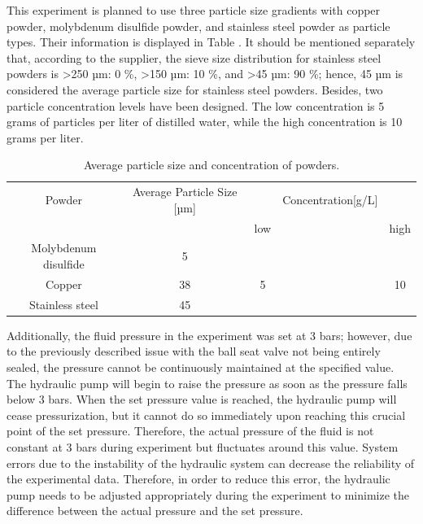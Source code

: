 This experiment is planned to use three particle size gradients with copper 
  powder, molybdenum disulfide powder, and stainless steel powder as particle 
  types. Their information is displayed in Table . It should be mentioned 
  separately that, according to the supplier, the sieve size distribution for 
  stainless steel powders is \textgreater 250 µm: 0 \%, \textgreater 150 µm: 10 \%, and \textgreater 45 µm: 90 \%; hence,
   45 µm is considered the average particle size for stainless steel powders.
 Besides, two particle concentration levels have been designed. The low 
 concentration is 5 grams of particles per liter of distilled water, 
 while the high concentration is 10 grams per liter.


\begin{table}[h!]
    \centering
    \begin{tabular}{|c| c |c c c|} 
     \hline
     Powder & Average Particle Size [µm] &     & Concentration[g/L] &  \\ [0.5ex] 
     
            &                            & low &                    & high \\
     \hline    
     Molybdenum disulfide & 5  & & &\\
     Copper &                         38 &  5  &                    & 10\\
     Stainless steel      & 45 & & &\\[1ex]
     \hline
    \end{tabular}
    \caption{Average particle size and concentration of powders.}
    \label{tab:Powder Information}
    \end{table}

   
Additionally, the fluid pressure in the experiment was set at 3 bars; however, 
 due to the previously described issue with the ball seat valve not being entirely 
 sealed, the pressure cannot be continuously maintained at the specified value. 
 The hydraulic pump will begin to raise the pressure as soon as the pressure 
 falls below 3 bars. When the set pressure value is reached, the hydraulic 
 pump will cease pressurization, but it cannot do so immediately upon reaching 
 this crucial point of the set pressure. Therefore, the actual pressure of the 
 fluid is not constant at 3 bars during experiment but fluctuates around this 
 value. System errors due to the instability of the hydraulic system can decrease
 the reliability of the experimental data. Therefore, in order to reduce this 
 error, the hydraulic pump needs to be adjusted appropriately during the experiment 
to minimize the difference between the actual pressure and the set pressure. \\

